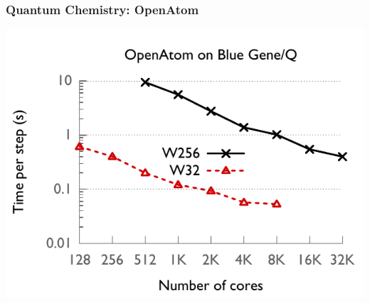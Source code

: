 \begin{frame}
\frametitle{Quantum Chemistry: OpenAtom}
\includegraphics[width=\textwidth]{../figures/openatom/bgq.pdf}
\end{frame}


